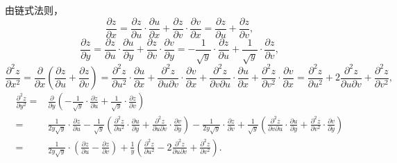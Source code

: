 \documentclass[../main.tex]{subfiles}
\begin{document}
\begin{enumerate}
          由链式法则，
          \[
              \frac{\partial z}{\partial x}= \frac{\partial z}{\partial u}\cdot
              \frac{\partial u}{\partial x}+ \frac{\partial z}{\partial v}\cdot \frac{\partial
                  v}{\partial x}= \frac{\partial z}{\partial u}+ \frac{\partial z}{\partial
                  v},
          \]
          \[
              \frac{\partial z}{\partial y}= \frac{\partial z}{\partial u}\cdot \frac{\partial
                  u}{\partial y}+ \frac{\partial z}{\partial v}\cdot \frac{\partial v}{\partial
                  y}= -\frac{1}{\sqrt{y}}\cdot \frac{\partial z}{\partial u}+ \frac{1}{\sqrt{y}}
              \cdot \frac{\partial z}{\partial v},
          \]
          \[
              \frac{\partial^{2} z}{\partial x^{2}}= \frac{\partial}{\partial x}\left(\frac{\partial
                  z}{\partial u}+ \frac{\partial z}{\partial v}\right) = \frac{\partial^{2} z}{\partial
                  u^{2}}\cdot \frac{\partial u}{\partial x}+ \frac{\partial^{2} z}{\partial
                  u\partial v}\cdot \frac{\partial v}{\partial x}+ \frac{\partial^{2} z}{\partial
                  v\partial u}\cdot \frac{\partial u}{\partial x}+ \frac{\partial^{2} z}{\partial
                  v^{2}}\cdot \frac{\partial v}{\partial x}= \frac{\partial^{2} z}{\partial
                  u^{2}}+ 2\frac{\partial^{2} z}{\partial u\partial v}+ \frac{\partial^{2} z}{\partial
                  v^{2}},
          \]
          \[
              \begin{aligned}
                  \frac{\partial^{2} z}{\partial y^{2}} = {} & \frac{\partial}{\partial y}\left(-\frac{1}{\sqrt{y}}\cdot \frac{\partial z}{\partial u} + \frac{1}{\sqrt{y}}\cdot \frac{\partial z}{\partial v}\right)                                                                                                                                                                                                                                                                                                                                                    \\
                  = {}                                       & \frac{1}{2y\sqrt{y}}\cdot \frac{\partial z}{\partial u} - \frac{1}{\sqrt{y}}\left(\frac{\partial^{2} z}{\partial u^{2}}\cdot \frac{\partial u}{\partial y} + \frac{\partial^{2} z}{\partial u \partial v}\cdot \frac{\partial v}{\partial y}\right) - \frac{1}{2y\sqrt{y}}\cdot \frac{\partial z}{\partial v} + \frac{1}{\sqrt{y}}\left(\frac{\partial^{2} z}{\partial v \partial u}\cdot \frac{\partial u}{\partial y} + \frac{\partial^{2} z}{\partial v^{2}}\cdot \frac{\partial v}{\partial y}\right) \\
                  = {}                                       & \frac{1}{2y\sqrt{y}}\cdot \left(\frac{\partial z}{\partial u} - \frac{\partial z}{\partial v}\right) + \frac{1}{y}\left(\frac{\partial^{2} z}{\partial u^{2}} - 2\frac{\partial^{2} z}{\partial u \partial v} + \frac{\partial^{2} z}{\partial v^{2}}\right).
              \end{aligned}
          \]


\end{enumerate}
\end{document}

